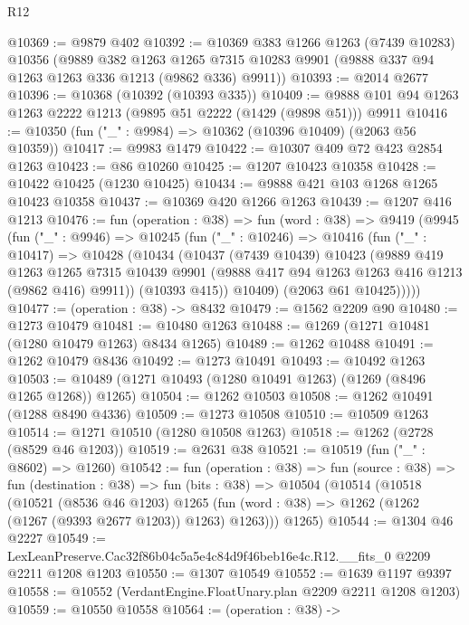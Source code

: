 \begin{lexlean}{R12}
\begin{coremodule}
@10369 := @9879 @402
@10392 := @10369
    @383
    @1266
    @1263
    (@7439 @10283)
    @10356
    (@9889
      @382
      @1263
      @1265
      @7315
      @10283
      @9901
      (@9888 @337 @94 @1263 @1263 @336 @1213 (@9862 @336) @9911))
@10393 := @2014 @2677
@10396 := @10368 (@10392 (@10393 @335))
@10409 := @9888 @101 @94 @1263 @1263 @2222 @1213 (@9895 @51 @2222 (@1429 (@9898 @51))) @9911
@10416 := @10350 (fun ("_" : @9984) => @10362 (@10396 @10409) (@2063 @56 @10359))
@10417 := @9983 @1479
@10422 := @10307 @409 @72 @423 @2854 @1263
@10423 := @86 @10260
@10425 := @1207 @10423 @10358
@10428 := @10422 @10425 (@1230 @10425)
@10434 := @9888 @421 @103 @1268 @1265 @10423 @10358
@10437 := @10369 @420 @1266 @1263
@10439 := @1207 @416 @1213
@10476 := fun (operation : @38) =>
  fun (word : @38) =>
  @9419
    (@9945
      (fun ("_" : @9946) =>
      @10245
        (fun ("_" : @10246) =>
        @10416
          (fun ("_" : @10417) =>
          @10428
            (@10434
              (@10437
                (@7439 @10439)
                @10423
                (@9889
                  @419
                  @1263
                  @1265
                  @7315
                  @10439
                  @9901
                  (@9888 @417 @94 @1263 @1263 @416 @1213 (@9862 @416) @9911))
                (@10393 @415))
              @10409)
            (@2063 @61 @10425)))))
@10477 := (operation : @38) -> @8432
@10479 := @1562 @2209 @90
@10480 := @1273 @10479
@10481 := @10480 @1263
@10488 := @1269 (@1271 @10481 (@1280 @10479 @1263) @8434 @1265)
@10489 := @1262 @10488
@10491 := @1262 @10479 @8436
@10492 := @1273 @10491
@10493 := @10492 @1263
@10503 := @10489 (@1271 @10493 (@1280 @10491 @1263) (@1269 (@8496 @1265 @1268)) @1265)
@10504 := @1262 @10503
@10508 := @1262 @10491 (@1288 @8490 @4336)
@10509 := @1273 @10508
@10510 := @10509 @1263
@10514 := @1271 @10510 (@1280 @10508 @1263)
@10518 := @1262 (@2728 (@8529 @46 @1203))
@10519 := @2631 @38
@10521 := @10519 (fun ("_" : @8602) => @1260)
@10542 := fun (operation : @38) =>
  fun (source : @38) =>
  fun (destination : @38) =>
  fun (bits : @38) =>
  @10504
    (@10514
      (@10518
        (@10521
          (@8536 @46 @1203)
          @1265
          (fun (word : @38) => @1262 (@1262 (@1267 (@9393 @2677 @1203)) @1263) @1263)))
      @1265)
@10544 := @1304 @46 @2227
@10549 := LexLeanPreserve.Cac32f86b04c5a5e4c84d9f46beb16e4c.R12.__fits_0 @2209 @2211 @1208 @1203
@10550 := @1307 @10549
@10552 := @1639 @1197 @9397
@10558 := @10552 (VerdantEngine.FloatUnary.plan @2209 @2211 @1208 @1203)
@10559 := @10550 @10558
@10564 := (operation : @38) ->

\end{coremodule}
\end{lexlean}
